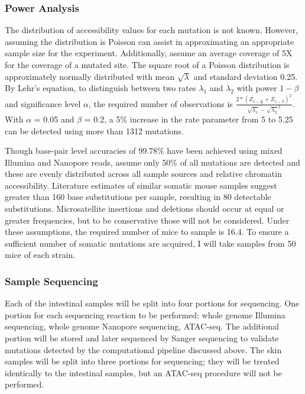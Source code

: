 \subsubsection{Power Analysis}

The distribution of accessibility values for each mutation is not known. However, assuming the distribution is Poisson can assist in approximating an appropriate sample size for the experiment. Additionally, assume an average coverage of 5X for the coverage of a mutated site. The square root of a Poisson distribution is approximately normally distributed with mean $\sqrt{\lambda}$ and standard deviation 0.25.
By Lehr's equation, to distinguish between two rates $\lambda_1$ and $\lambda_2$ with power $1 - \beta$ and significance level $\alpha$, the required number of observations is $\frac{2 * (Z_{1 - \frac{\alpha}{2}} + Z_{1 - \beta})^2}{{\sqrt{\lambda_1} - \sqrt{\lambda_2}}^2}$. With $\alpha$ = 0.05 and $\beta$ = 0.2, a 5\% increase in the rate parameter from 5 to 5.25 can be detected using more than 1312 mutations.

Though base-pair level accuracies of 99.78\% have been achieved using mixed Illumina and Nanopore reads, assume only 50\% of all mutations are detected and these are evenly distributed across all sample sources and relative chromatin accessibility. Literature estimates \parencite{behjati_genome_2014} of similar somatic mouse samples suggest greater than 160 base substitutions per sample, resulting in 80 detectable substitutions. Microsatellite insertions and deletions should occur at equal or greater frequencies, but to be conservative those will not be considered. Under these assumptions, the required number of mice to sample is 16.4. To ensure a sufficient number of somatic mutations are acquired, I will take samples from 50 mice of each strain.


\subsubsection{Sample Sequencing}

Each of the intestinal samples will be split into four portions for sequencing. One portion for each sequencing reaction to be performed: whole genome Illumina sequencing, whole genome Nanopore sequencing, ATAC-seq. The additional portion will be stored and later sequenced by Sanger sequencing to validate mutations detected by the computational pipeline discussed above. The skin samples will be split into three portions for sequencing; they will be treated identically to the intestinal samples, but an ATAC-seq procedure will not be performed.

